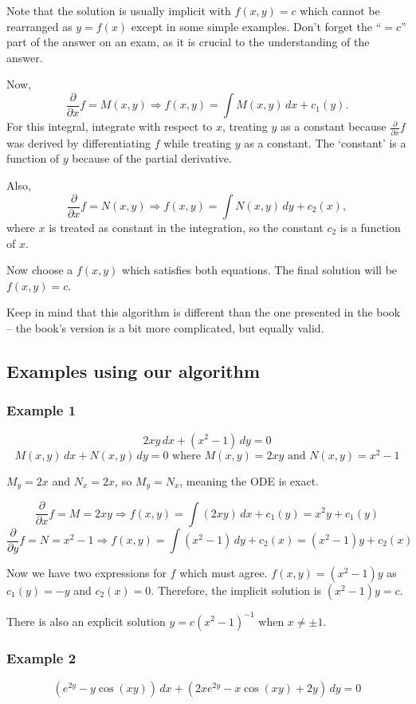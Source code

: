\documentclass[11pt]{article}
\newcommand{\fpdx}{\frac{\partial}{\partial x}} %
\newcommand{\fpdy}{\frac{\partial}{\partial y}} %
\newcommand{\dx}{\,dx} %
\newcommand{\dy}{\,dy} %
\begin{document}
	Note that the solution is usually implicit with $f(x,y) = c$ which cannot be rearranged as $y = f(x)$ except in some simple examples. Don't forget the ``$ = c$'' part of the answer on an exam, as it is crucial to the understanding of the answer.

	Now,
		$$ \fpdx f = M(x,y) \Rightarrow f(x,y) = \int M(x,y)\dx + c_1 (y). $$
	For this integral, integrate with respect to $x$, treating $y$ as a constant because $\fpdx f$ was derived by differentiating $f$ while treating $y$ as a constant. The `constant' is a function of $y$ because of the partial derivative.

	Also,
		$$ \fpdx f = N(x,y) \Rightarrow f(x,y) = \int N(x,y)\dy + c_2 (x), $$
	where $x$ is treated as constant in the integration, so the constant $c_2$ is a function of $x$.

	Now choose a $f(x,y)$ which satisfies both equations. The final solution will be $f(x,y) = c$.

	Keep in mind that this algorithm is different than the one presented in the book -- the book's version is a bit more complicated, but equally valid.

\subsection{Examples using our algorithm}
\subsubsection{Example 1}
	$$ 2xy\dx + (x^2 - 1)\dy = 0 $$
	$$ M(x,y)\dx + N(x,y)\dy = 0 \text{ where } M(x,y) = 2xy \text{ and } N(x,y) = x^2 - 1 $$

	$M_y = 2x$ and $N_x = 2x$, so $M_y = N_x$, meaning the ODE is exact.

	$$ \fpdx f = M = 2xy \Rightarrow f(x,y) = \int (2xy)\dx + c_1 (y) = x^2y + c_1(y) $$
	$$ \fpdy f = N = x^2 - 1 \Rightarrow f(x,y) = \int (x^2 - 1)\dy + c_2 (x) = (x^2 - 1) y + c_2 (x) $$

	Now we have two expressions for $f$ which must agree. $f(x,y) = (x^2 - 1)y$ as $c_1(y) = -y$ and $c_2 (x) = 0$. Therefore, the implicit solution is $(x^2-1)y = c$.

	There is also an explicit solution $y = c (x^2 - 1)^{-1}$ when $x \neq \pm 1$.

\subsubsection{Example 2}
	$$ (e^{2y} - y \cos(xy))\dx + (2xe^{2y} - x \cos(xy) + 2y)\dy = 0 $$
\end{document}

